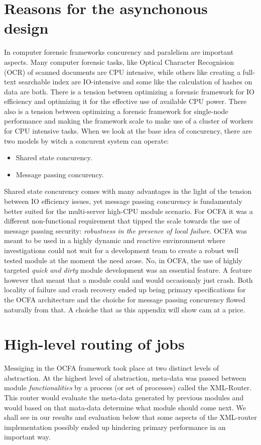 \section{Reasons for the asynchonous design}
In computer forensic frameworks concurency and paralelism are important aspects. Many computer forensic tasks, like Optical Character Recognision (OCR) of scanned documents are CPU intensive, while others like creating a full-text searchable index are IO-intensive and some like the calculation of hashes on data are both. There is a tension between optimizing a forensic framework for IO efficiency and optimizing it for the effective use of available CPU power. There also is a tension between optimizing a forensic framework for single-node performance and making the framework scale to make use of a cluster of workers for CPU intensive tasks. When we look at the base idea of concurency, there are two models by witch a concurent system can operate: 
\begin{itemize}
\item Shared state concurency.
\item Message passing concurency.
\end{itemize}
Shared state concurency comes with many advantages in the light of the tension between IO efficiency issues, yet message passing concurency is fundamentaly better suited for the multi-server high-CPU module scenario. For OCFA it was a different non-functional requirement that tipped the scale towards the use of message passing security: \emph{robustness in the presence of local failure}. OCFA was meant to be used in
a highly dynamic and reactive envinronment where investigations could not wait for a development team to create a robust well tested module at the moment the need arose. No, in OCFA, the use of highly targeted \emph{quick and dirty} module development was an essential feature. A feature however that meant that a module could and would occasionaly just crash. Both locality of failure and crash recovery ended up being primary specifications for the OCFA architecture and the choiche for message passing concurency flowed naturally from that. A choiche that as this appendix will show cam at a price.
\section{High-level routing of jobs}
Messiging in the OCFA framework took place at two distinct levels of abstraction. At the highest level of abstraction, meta-data was passed between module \emph{functionalities} by a process (or set of processes) called the XML-Router. This router would evaluate the meta-data generated by previous modules and would based on that mata-data determine what module should come next. We shall see in our results and evaluation below that some aspects of the XML-router implementation possibly ended up hindering primary performance in an important way.
